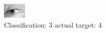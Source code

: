 \begin{figure}[h!]
\begin{center}
\includegraphics[width=0.60\columnwidth]{figures/ID2926_class_3_target_4.png}
\end{center}
\caption{ Classification: 3 actual target: 4}
\label{fig:ID2926_class_3_target_4}
\end{figure}
